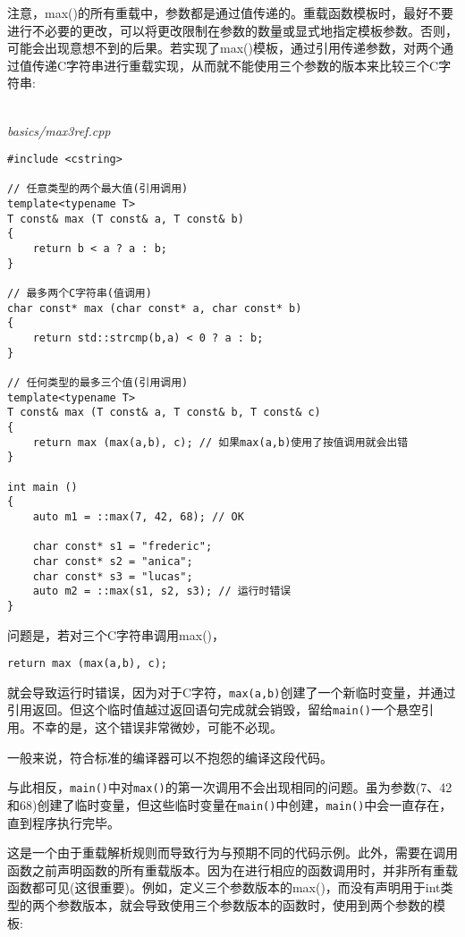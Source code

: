 注意，max()的所有重载中，参数都是通过值传递的。重载函数模板时，最好不要进行不必要的更改，可以将更改限制在参数的数量或显式地指定模板参数。否则，可能会出现意想不到的后果。若实现了max()模板，通过引用传递参数，对两个通过值传递C字符串进行重载实现，从而就不能使用三个参数的版本来比较三个C字符串:

\hspace*{\fill} \\ %
\noindent
\textit{basics/max3ref.cpp}
\begin{lstlisting}[style=styleCXX]
#include <cstring>

// 任意类型的两个最大值(引用调用)
template<typename T>
T const& max (T const& a, T const& b)
{
	return b < a ? a : b;
}

// 最多两个C字符串(值调用)
char const* max (char const* a, char const* b)
{
	return std::strcmp(b,a) < 0 ? a : b;
}

// 任何类型的最多三个值(引用调用)
template<typename T>
T const& max (T const& a, T const& b, T const& c)
{
	return max (max(a,b), c); // 如果max(a,b)使用了按值调用就会出错
}

int main ()
{
	auto m1 = ::max(7, 42, 68); // OK
	
	char const* s1 = "frederic";
	char const* s2 = "anica";
	char const* s3 = "lucas";
	auto m2 = ::max(s1, s2, s3); // 运行时错误
}
\end{lstlisting}

问题是，若对三个C字符串调用max()，

\begin{lstlisting}[style=styleCXX]
return max (max(a,b), c);
\end{lstlisting}

就会导致运行时错误，因为对于C字符，\texttt{max(a,b)}创建了一个新临时变量，并通过引用返回。但这个临时值越过返回语句完成就会销毁，留给\texttt{main()}一个悬空引用。不幸的是，这个错误非常微妙，可能不必现。

\begin{tcolorbox}[colback=webgreen!5!white,colframe=webgreen!75!black]
\hspace*{0.75cm}一般来说，符合标准的编译器可以不抱怨的编译这段代码。
\end{tcolorbox}

与此相反，\texttt{main()}中对\texttt{max()}的第一次调用不会出现相同的问题。虽为参数(7、42和68)创建了临时变量，但这些临时变量在\texttt{main()}中创建，\texttt{main()}中会一直存在，直到程序执行完毕。

这是一个由于重载解析规则而导致行为与预期不同的代码示例。此外，需要在调用函数之前声明函数的所有重载版本。因为在进行相应的函数调用时，并非所有重载函数都可见(这很重要)。例如，定义三个参数版本的max()，而没有声明用于int类型的两个参数版本，就会导致使用三个参数版本的函数时，使用到两个参数的模板:

